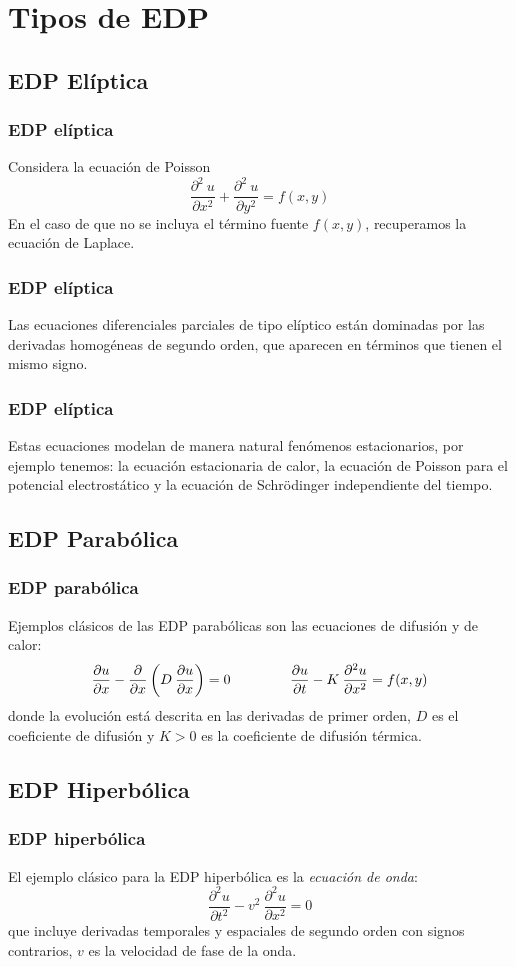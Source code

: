 \documentclass[12pt]{beamer}
\begin{document}
\section{Tipos de EDP}
\subsection{EDP Elíptica}
\begin{frame}
\frametitle{EDP elíptica}
Considera la ecuación de Poisson
\[ \dfrac{\partial^{2} \: u}{\partial x^{2}} + \dfrac{\partial^{2} \: u}{\partial y^{2}} = f(x, y) \]
En el caso de que no se incluya el término fuente $f(x, y)$, recuperamos la ecuación de Laplace.
\end{frame}
\begin{frame}
\frametitle{EDP elíptica}
Las ecuaciones diferenciales parciales de tipo elíptico están dominadas por las derivadas homogéneas de segundo orden, que aparecen en términos que tienen el mismo signo.
\end{frame}
\begin{frame}
\frametitle{EDP elíptica}
Estas ecuaciones modelan de manera natural fenómenos estacionarios, por ejemplo tenemos: la ecuación estacionaria de calor, la ecuación de Poisson para el potencial electrostático y la ecuación de Schrödinger independiente del tiempo.
\end{frame}
\subsection{EDP Parabólica}
\begin{frame}
\frametitle{EDP parabólica}
Ejemplos clásicos de las EDP parabólicas son las ecuaciones de difusión y de calor:
\[ \dfrac{\partial u}{\partial x} - \dfrac{\partial}{\partial x} \left( D \: \dfrac{\partial u}{\partial x} \right) = 0 \hspace{1.5cm} \dfrac{\partial u}{\partial t} - K \: \dfrac{\partial^{2} u}{\partial x^{2}}  = f(x,y) \]
\pause
donde la evolución está descrita en las derivadas de primer orden, $D$ es el coeficiente de difusión y $K > 0$ es la coeficiente de difusión térmica.
\end{frame}
\subsection{EDP Hiperbólica}
\begin{frame}
\frametitle{EDP hiperbólica}
El ejemplo clásico para la EDP hiperbólica es la \emph{ecuación de onda}:
\[ \dfrac{\partial^{2} u}{\partial t^{2}}  - v^{2} \: \dfrac{\partial^{2} u}{\partial x^{2}} = 0 \]
que incluye derivadas temporales y espaciales de segundo orden con signos contrarios, $v$ es la velocidad de fase de la onda.
\end{frame}
\end{document}
